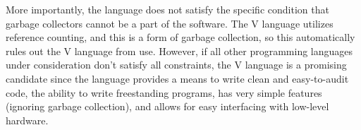 \documentclass[letterpaper,twocolumn,10pt]{article}
\begin{document}
More importantly, the language does not satisfy the specific condition that garbage collectors cannot be a part of the software. The V language utilizes reference counting, and this is a form of garbage collection, so this automatically rules out the V language from use. However, if all other programming languages under consideration don't satisfy all constraints, the V language is a promising candidate since the language provides a means to write clean and easy-to-audit code, the ability to write freestanding programs, has very simple features (ignoring garbage collection), and allows for easy interfacing with low-level hardware.




\end{document}
